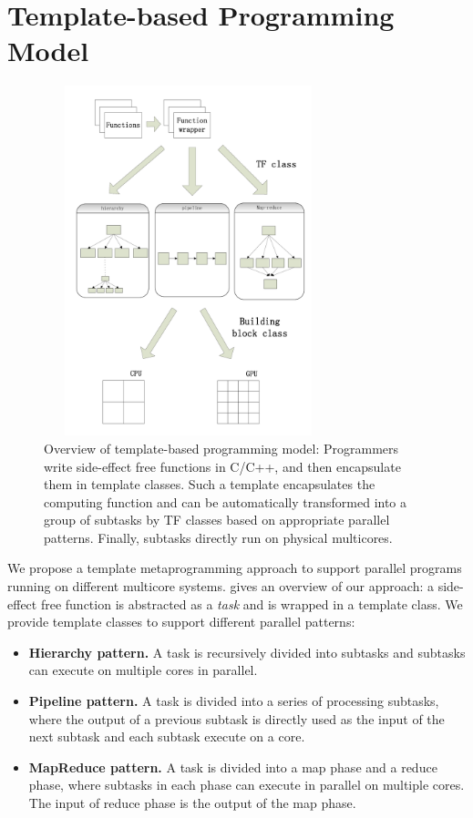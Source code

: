 \section{Template-based Programming Model}
\label{sec:model}

\begin{figure}[htb]
\includegraphics[width=3.3in, height=4.0in]{../overview}
\caption{Overview of template-based programming model: Programmers
write side-effect free functions in C/C++, and then encapsulate them in
template classes. Such a template encapsulates the computing function and can be 
automatically transformed into a
group of subtasks by TF classes based on appropriate parallel patterns. Finally,
subtasks directly run on physical multicores.}
\label{fig:overview}
\end{figure}

We propose a template metaprogramming approach to support parallel programs
running on different multicore systems.  gives an overview
of our approach: a side-effect free function is abstracted as a \emph{task}
and is wrapped in a template class. We provide template classes
to support different parallel patterns:

\begin{itemize}
\item \textbf{Hierarchy pattern.} A task is recursively divided into subtasks
and subtasks can execute on multiple cores in parallel.

\item \textbf{Pipeline pattern.} A task is divided into a series of processing
subtasks, where the output of a previous subtask is directly used as the input
of the next subtask and each subtask execute on a core.

\item \textbf{MapReduce pattern.} A task is divided into a map phase and a
reduce phase, where subtasks in each phase can execute in parallel on multiple
cores. The input of reduce phase is the output of the map phase.

\end{itemize}

